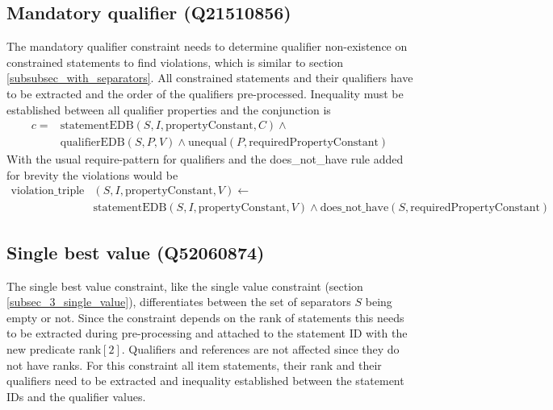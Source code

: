 \documentclass[hyperref,bachelorofscience,fleqn]{cgvpub}
\begin{document}
\subsection{Mandatory qualifier (Q21510856)}
The mandatory qualifier constraint needs to determine qualifier non-existence on constrained statements to find violations, which is similar to section \ref{subsubsec_with_separators}. All constrained statements and their qualifiers have to be extracted and the order of the qualifiers pre-processed. Inequality must be established between all qualifier properties and the conjunction is 
\begin{equation*}
\begin{split}
c = &\text{statementEDB}(S, I, \text{propertyConstant}, C) \wedge{} \\
&\text{qualifierEDB}(S, P, V) \wedge \text{unequal}(P, \text{requiredPropertyConstant})
\end{split}
\end{equation*}
With the usual require-pattern for qualifiers and the does\_not\_have rule added for brevity the violations would be
\begin{equation*}
\begin{split}
\text{violation\_triple}&(S, I, \text{propertyConstant}, V) \leftarrow \\
&\text{statementEDB}(S, I, \text{propertyConstant}, V) \wedge \text{does\_not\_have}(S, \text{requiredPropertyConstant})
\end{split}
\end{equation*}

\subsection{Single best value (Q52060874)}
The single best value constraint, like the single value constraint (section \ref{subsec_3_single_value}), differentiates between the set of separators \(S\) being empty or not. Since the constraint depends on the rank of statements this needs to be extracted during pre-processing and attached to the statement ID with the new predicate rank\([2]\). Qualifiers and references are not affected since they do not have ranks. For this constraint all item statements, their rank and their qualifiers need to be extracted and inequality established between the statement IDs and the qualifier values.\\
\end{document}
